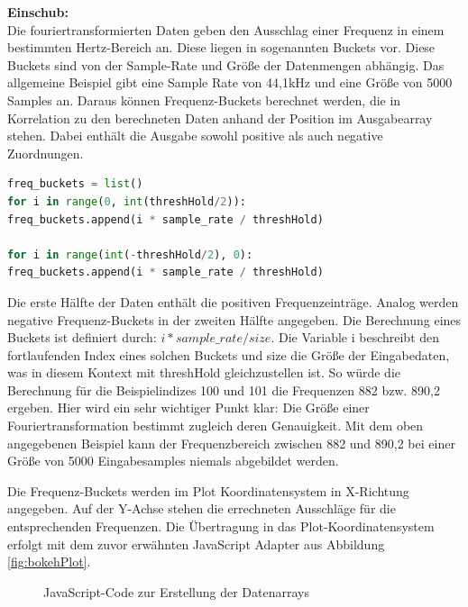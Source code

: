 \begin{addmargin}[1cm]{1cm}
\textbf{Einschub:}\\
Die fouriertransformierten Daten geben den Ausschlag einer Frequenz in einem bestimmten Hertz-Bereich an. Diese liegen in sogenannten Buckets vor. Diese Buckets sind von der Sample-Rate und Größe der Datenmengen abhängig. Das allgemeine Beispiel gibt eine Sample Rate von 44,1kHz und eine Größe von 5000 Samples an. Daraus können Frequenz-Buckets berechnet werden, die in Korrelation zu den berechneten Daten anhand der Position im Ausgabearray stehen.  Dabei enthält die Ausgabe sowohl positive als auch negative Zuordnungen.
\begin{lstlisting}[language=Python, frame=none, numbers=none]
freq_buckets = list()
for i in range(0, int(threshHold/2)):
freq_buckets.append(i * sample_rate / threshHold)

for i in range(int(-threshHold/2), 0):
freq_buckets.append(i * sample_rate / threshHold)
\end{lstlisting}

Die erste Hälfte der Daten enthält die positiven Frequenzeinträge. Analog werden negative Frequenz-Buckets in der zweiten Hälfte angegeben. Die Berechnung eines Buckets ist definiert durch: $i * sample\_rate / size$. Die Variable i beschreibt den fortlaufenden Index eines solchen Buckets und size die Größe der Eingabedaten, was in diesem Kontext mit threshHold gleichzustellen ist. So würde die Berechnung für die Beispielindizes 100 und 101 die Frequenzen 882 bzw. 890,2 ergeben. Hier wird ein sehr wichtiger Punkt klar: Die Größe einer Fouriertransformation bestimmt zugleich deren Genauigkeit. Mit dem oben angegebenen Beispiel kann der Frequenzbereich zwischen 882 und 890,2 bei einer Größe von 5000 Eingabesamples niemals abgebildet werden.
\end{addmargin}

Die Frequenz-Buckets werden im Plot Koordinatensystem in X-Richtung angegeben. Auf der Y-Achse stehen die errechneten Ausschläge für die entsprechenden Frequenzen. 
Die Übertragung in das Plot-Koordinatensystem erfolgt mit dem zuvor erwähnten JavaScript Adapter aus Abbildung \ref{fig:bokehPlot}. 
\newpage
\begin{figure}[h!]
	
	\caption{JavaScript-Code zur Erstellung der Datenarrays}
	\label{fig:createDataArraysBokeh}
\end{figure}

